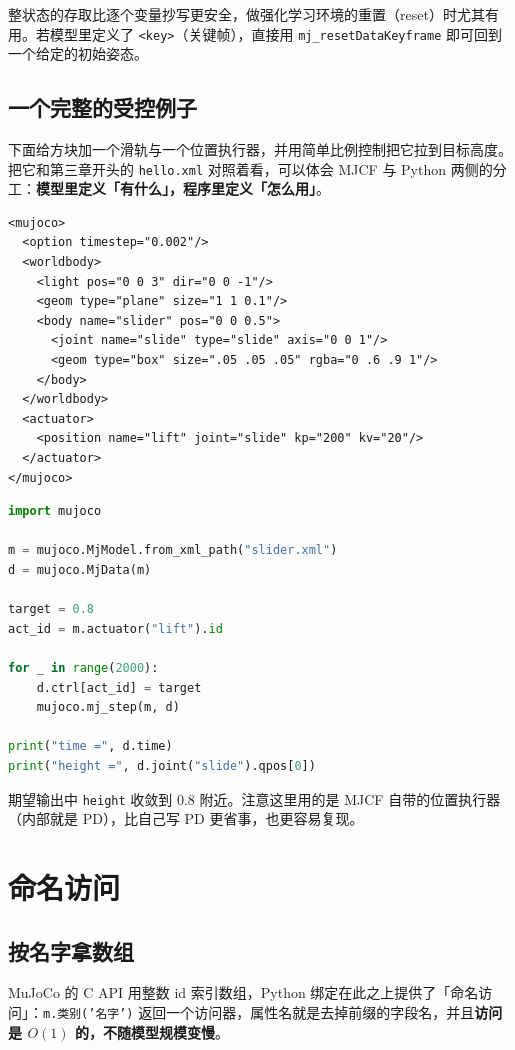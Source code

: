 整状态的存取比逐个变量抄写更安全，做强化学习环境的重置（reset）时尤其有用。若模型里定义了 \texttt{<key>}（关键帧），直接用 \texttt{mj\_resetDataKeyframe} 即可回到一个给定的初始姿态。

\subsection{一个完整的受控例子}

下面给方块加一个滑轨与一个位置执行器，并用简单比例控制把它拉到目标高度。把它和第三章开头的 \texttt{hello.xml} 对照着看，可以体会 MJCF 与 Python 两侧的分工：\textbf{模型里定义「有什么」，程序里定义「怎么用」}。

\begin{lstlisting}[style=xml]
<mujoco>
  <option timestep="0.002"/>
  <worldbody>
    <light pos="0 0 3" dir="0 0 -1"/>
    <geom type="plane" size="1 1 0.1"/>
    <body name="slider" pos="0 0 0.5">
      <joint name="slide" type="slide" axis="0 0 1"/>
      <geom type="box" size=".05 .05 .05" rgba="0 .6 .9 1"/>
    </body>
  </worldbody>
  <actuator>
    <position name="lift" joint="slide" kp="200" kv="20"/>
  </actuator>
</mujoco>
\end{lstlisting}

\begin{lstlisting}[style=code, language=Python]
import mujoco

m = mujoco.MjModel.from_xml_path("slider.xml")
d = mujoco.MjData(m)

target = 0.8
act_id = m.actuator("lift").id

for _ in range(2000):
    d.ctrl[act_id] = target
    mujoco.mj_step(m, d)

print("time =", d.time)
print("height =", d.joint("slide").qpos[0])
\end{lstlisting}

期望输出中 \texttt{height} 收敛到 $0.8$ 附近。注意这里用的是 MJCF 自带的位置执行器（内部就是 PD），比自己写 PD 更省事，也更容易复现。

\section{命名访问}

\subsection{按名字拿数组}

MuJoCo 的 C API 用整数 id 索引数组，Python 绑定在此之上提供了「命名访问」：\texttt{m.类别('名字')} 返回一个访问器，属性名就是去掉前缀的字段名，并且\textbf{访问是 $O(1)$ 的，不随模型规模变慢}。

